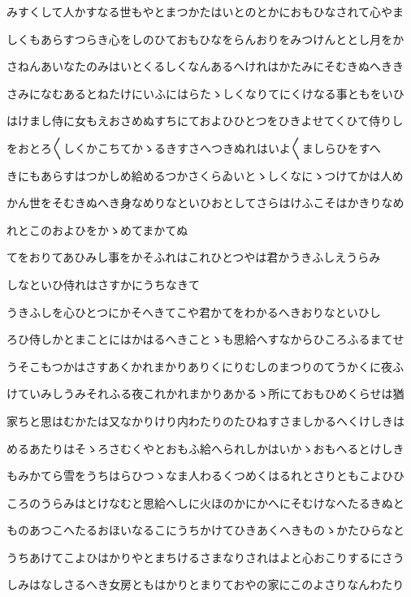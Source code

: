 \documentclass[a4paper,11pt,landscape]{ltjtarticle}
\begin{document}
\par\medskip
みすくして人かすなる世もやとまつかたはいとのとかにおもひなされて心やま
\par\medskip
しくもあらすつらき心をしのひておもひなをらんおりをみつけんととし月をか
\par\medskip
さねんあいなたのみはいとくるしくなんあるへけれはかたみにそむきぬへきき
\par\medskip
さみになむあるとねたけにいふにはらたゝしくなりてにくけなる事ともをいひ
\par\medskip
はけまし侍に女もえおさめぬすちにておよひひとつをひきよせてくひて侍りし
\par\medskip
をおとろ〱しくかこちてかゝるきすさへつきぬれはいよ〱ましらひをすへ
\par\medskip
きにもあらすはつかしめ給めるつかさくらゐいとゝしくなにゝつけてかは人め
\par\medskip
かん世をそむきぬへき身なめりなといひおとしてさらはけふこそはかきりなめ
\par\medskip
れとこのおよひをかゝめてまかてぬ
\par\medskip
てをおりてあひみし事をかそふれはこれひとつやは君かうきふしえうらみ
\par\medskip
しなといひ侍れはさすかにうちなきて
\par\medskip
うきふしを心ひとつにかそへきてこや君かてをわかるへきおりなといひし
\par\medskip
ろひ侍しかとまことにはかはるへきことゝも思給へすなからひころふるまてせ
\par\medskip
うそこもつかはさすあくかれまかりありくにりむしのまつりのてうかくに夜ふ
\par\medskip
けていみしうみそれふる夜これかれまかりあかるゝ所にておもひめくらせは猶
\par\medskip
家ちと思はむかたは又なかりけり内わたりのたひねすさましかるへくけしきは
\par\medskip
めるあたりはそゝろさむくやとおもふ給へられしかはいかゝおもへるとけしき
\par\medskip
もみかてら雪をうちはらひつゝなま人わるくつめくはるれとさりともこよひひ
\par\medskip
ころのうらみはとけなむと思給へしに火ほのかにかへにそむけなへたるきぬと
\par\medskip
ものあつこへたるおほいなるこにうちかけてひきあくへきものゝかたひらなと
\par\medskip
うちあけてこよひはかりやとまちけるさまなりされはよと心おこりするにさう
\par\medskip
しみはなしさるへき女房ともはかりとまりておやの家にこのよさりなんわたり
\end{document}
